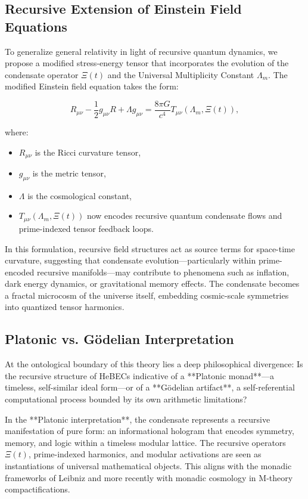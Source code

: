 \documentclass{article}
\theoremstyle{plain}
\begin{document}
\subsection{Recursive Extension of Einstein Field Equations}

To generalize general relativity in light of recursive quantum dynamics, we propose a modified stress-energy tensor that incorporates the evolution of the condensate operator \( \Xi(t) \) and the Universal Multiplicity Constant \( \Lambda_m \). The modified Einstein field equation takes the form:

\begin{equation}
R_{\mu \nu} - \frac{1}{2}g_{\mu \nu}R + \Lambda g_{\mu \nu} = \frac{8 \pi G}{c^4} T_{\mu \nu}(\Lambda_m, \Xi(t)),
\end{equation}

where:
\begin{itemize}
    \item \( R_{\mu \nu} \) is the Ricci curvature tensor,
    \item \( g_{\mu \nu} \) is the metric tensor,
    \item \( \Lambda \) is the cosmological constant,
    \item \( T_{\mu \nu}(\Lambda_m, \Xi(t)) \) now encodes recursive quantum condensate flows and prime-indexed tensor feedback loops.
\end{itemize}

In this formulation, recursive field structures act as source terms for space-time curvature, suggesting that condensate evolution—particularly within prime-encoded recursive manifolds—may contribute to phenomena such as inflation, dark energy dynamics, or gravitational memory effects. The condensate becomes a fractal microcosm of the universe itself, embedding cosmic-scale symmetries into quantized tensor harmonics.

\subsection{Platonic vs. Gödelian Interpretation}

At the ontological boundary of this theory lies a deep philosophical divergence: Is the recursive structure of HeBECs indicative of a **Platonic monad**—a timeless, self-similar ideal form—or of a **Gödelian artifact**, a self-referential computational process bounded by its own arithmetic limitations?

In the **Platonic interpretation**, the condensate represents a recursive manifestation of pure form: an informational hologram that encodes symmetry, memory, and logic within a timeless modular lattice. The recursive operators \( \Xi(t) \), prime-indexed harmonics, and modular activations are seen as instantiations of universal mathematical objects. This aligns with the monadic frameworks of Leibniz and more recently with monadic cosmology in M-theory compactifications.
\end{document}
